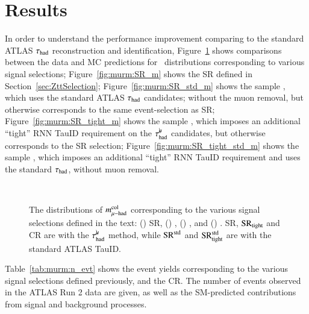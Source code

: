 \section{Results} \label{sec:results}
    In order to understand the performance improvement 
    comparing to the standard ATLAS $\tau_{\text{had}}$ reconstruction and identification,
    Figure~\ref{fig:murm:SRcmp} shows comparisons between the data and MC predictions for \mcol\ distributions corresponding to various signal selections;
    Figure~\ref{fig:murm:SR_m} shows the SR defined in Section~\ref{sec:ZttSelection};
    Figure~\ref{fig:murm:SR_std_m} shows the sample \SRstd, which uses the standard ATLAS $\tau_{\text{had}}$ candidates;
    without the muon removal, but otherwise corresponds to the same event-selection as SR;
    Figure~\ref{fig:murm:SR_tight_m} shows the sample \SRtight, which
    imposes an additional ``tight'' RNN TauID requirement on the $\tau_\mathrm{had}^{\mu\mkern-10mu\backslash}$ candidates, but otherwise corresponds
    to the SR selection;
    Figure~\ref{fig:murm:SR_tight_std_m} shows the sample \SRtightstd, which
    imposes an additional ``tight'' RNN TauID requirement and uses the standard $\tau_{\text{had}}$, without muon removal.
    
    \begin{figure}[htbp]
        \centering
        \\
        \caption{The distributions of $m_{\mu\mathrm{-}\mathrm{had}}^\mathrm{col}$ corresponding to the various signal selections defined in the text: 
            (\protect{}) SR, 
            (\protect{}) \SRstd, 
            (\protect{}) \SRtight, and
            (\protect{})  \SRtightstd.
            SR, $\mathrm{SR}_\mathrm{tight}$ and CR are with the $\tau_\mathrm{had}^{\mu\mkern-10mu\backslash}$ method, while $\mathrm{SR}^\mathrm{std}$ and $\mathrm{SR}_\mathrm{tight}^\mathrm{std}$ are with the standard ATLAS TauID.
        }
        \label{fig:murm:SRcmp}
    \end{figure}
    Table~\ref{tab:murm:n_evt} shows the event yields corresponding to the various signal selections defined previously,
    and the CR. The number of events observed in 
    the ATLAS Run 2 data are given, as well as the SM-predicted contributions from signal and background processes. 
        

